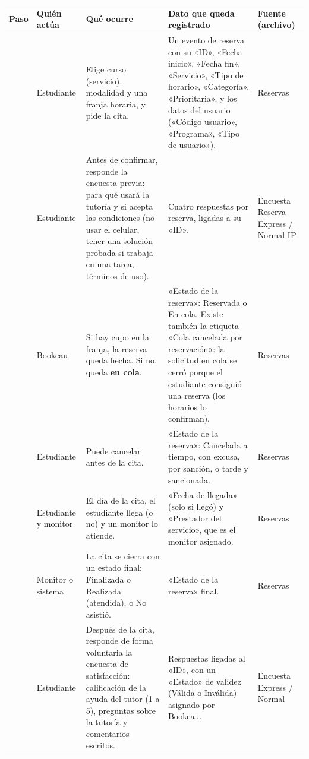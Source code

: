 \documentclass[11pt,letterpaper]{article}
\begin{document}
\begingroup
\small
\setlength{\tabcolsep}{4pt}
\renewcommand{\arraystretch}{1.15}

\begin{longtable}{
>{\raggedleft\arraybackslash}p{}
>{\raggedright\arraybackslash}p{}
>{\raggedright\arraybackslash}p{}
>{\raggedright\arraybackslash}p{}
>{\raggedright\arraybackslash}p{}
}
\toprule
\textbf{Paso} &
\textbf{Quién actúa} &
\textbf{Qué ocurre} &
\textbf{Dato que queda registrado} &
\textbf{Fuente (archivo)} \\
\midrule
\endhead

1 & Estudiante & Elige curso (servicio), modalidad y una franja horaria, y pide la cita. & Un evento de reserva con su «ID», «Fecha inicio», «Fecha fin», «Servicio», «Tipo de horario», «Categoría», «Prioritaria», y los datos del usuario («Código usuario», «Programa», «Tipo de usuario»). & Reservas \\
2 & Estudiante & Antes de confirmar, responde la encuesta previa: para qué usará la tutoría y si acepta las condiciones (no usar el celular, tener una solución probada si trabaja en una tarea, términos de uso). & Cuatro respuestas por reserva, ligadas a su «ID». & Encuesta Reserva Express / Normal IP \\
3 & Bookeau & Si hay cupo en la franja, la reserva queda hecha. Si no, queda \textbf{en cola}. & «Estado de la reserva»: Reservada o En cola. Existe también la etiqueta «Cola cancelada por reservación»: la solicitud en cola se cerró porque el estudiante consiguió una reserva (los horarios lo confirman). & Reservas \\
4 & Estudiante & Puede cancelar antes de la cita. & «Estado de la reserva»: Cancelada a tiempo, con excusa, por sanción, o tarde y sancionada. & Reservas \\
5 & Estudiante y monitor & El día de la cita, el estudiante llega (o no) y un monitor lo atiende. & «Fecha de llegada» (solo si llegó) y «Prestador del servicio», que es el monitor asignado. & Reservas \\
6 & Monitor o sistema & La cita se cierra con un estado final: Finalizada o Realizada (atendida), o No asistió. & «Estado de la reserva» final. & Reservas \\
7 & Estudiante & Después de la cita, responde de forma voluntaria la encuesta de satisfacción: calificación de la ayuda del tutor (1 a 5), preguntas sobre la tutoría y comentarios escritos. & Respuestas ligadas al «ID», con un «Estado» de validez (Válida o Inválida) asignado por Bookeau. & Encuesta Express / Normal \\

\end{longtable}
\end{document}
